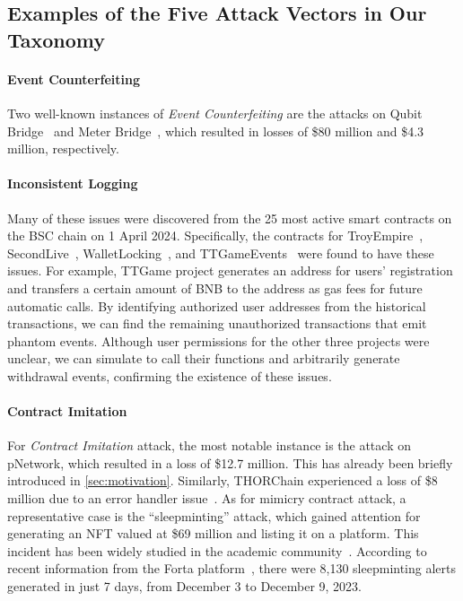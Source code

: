 \subsection{Examples of the Five Attack Vectors in Our Taxonomy}
\label{appendix:examples}

\paragraph{Event Counterfeiting}
Two well-known instances of \emph{Event Counterfeiting} are the attacks on Qubit Bridge~\cite{Qubit} and Meter Bridge~\cite{Meter}, which resulted in losses of \$80 million and \$4.3 million, respectively.

\paragraph{Inconsistent Logging}
Many of these issues were discovered from the 25 most active smart contracts on the BSC chain on 1 April 2024. Specifically, the contracts for TroyEmpire~\cite{TroyEmpire}, SecondLive~\cite{SecondLive}, WalletLocking~\cite{WalletLocking}, and TTGameEvents~\cite{TTGame} were found to have these issues. For example, TTGame project generates an address for users' registration and transfers a certain amount of BNB to the address as gas fees for future automatic calls. By identifying authorized user addresses from the historical transactions, we can find the remaining unauthorized transactions that emit phantom events. Although user permissions for the other three projects were unclear, we can simulate to call their functions and arbitrarily generate withdrawal events, confirming the existence of these issues.

\paragraph{Contract Imitation}
For \emph{Contract Imitation} attack, the most notable instance is the attack on pNetwork, which resulted in a loss of \$12.7 million. This has already been briefly introduced in \cref{sec:motivation}. Similarly, THORChain experienced a loss of \$8 million due to an error handler issue~\cite{thorchain}. As for mimicry contract attack, a representative case is the ``sleepminting'' attack, which gained attention for generating an NFT valued at \$69 million and listing it on a platform. This incident has been widely studied in the academic community~\cite{nft_sleepminting,clone_nft,sleepminting}. According to recent information from the Forta platform~\cite{sleepminting_forta}, there were 8,130 sleepminting alerts generated in just 7 days, from December 3 to December 9, 2023.

